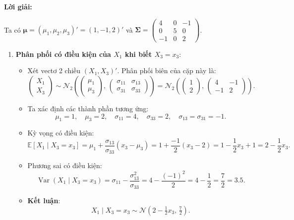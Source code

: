 \documentclass[11pt,a4paper]{article}
\newenvironment{solution}{%
  \par\noindent\textbf{Lời giải:}\ \ignorespaces
}{\par}
\theoremstyle{definition}
\newcommand{\answer}[1]{\boxed{#1}}
\begin{document}
\begin{solution}
Ta có $\boldsymbol{\mu} = (\mu_1, \mu_2, \mu_3)' = (1, -1, 2)'$ và $\boldsymbol{\Sigma} = \begin{pmatrix} 4 & 0 & -1 \\ 0 & 5 & 0 \\ -1 & 0 & 2 \end{pmatrix}$.

\begin{enumerate}[label=\textbf{\alph*)}]
  \item \textbf{Phân phối có điều kiện của $X_1$ khi biết $X_3 = x_3$}:
  \begin{itemize}
    \item Xét vectơ 2 chiều $(X_1, X_3)'$. Phân phối biên của cặp này là:
    \[
    \begin{pmatrix} X_1 \\ X_3 \end{pmatrix} \sim \mathcal{N}_2\left( \begin{pmatrix} \mu_1 \\ \mu_3 \end{pmatrix}, \, \begin{pmatrix} \sigma_{11} & \sigma_{13} \\ \sigma_{31} & \sigma_{33} \end{pmatrix} \right) = \mathcal{N}_2\left( \begin{pmatrix} 1 \\ 2 \end{pmatrix}, \, \begin{pmatrix} 4 & -1 \\ -1 & 2 \end{pmatrix} \right).
    \]
    \item Ta xác định các thành phần tương ứng:
    \[
    \mu_1 = 1, \quad \mu_3 = 2, \quad \sigma_{11} = 4, \quad \sigma_{33} = 2, \quad \sigma_{13} = \sigma_{31} = -1.
    \]
    \item Kỳ vọng có điều kiện:
    \[
    \mathbb{E}[X_1 \mid X_3 = x_3] = \mu_1 + \frac{\sigma_{13}}{\sigma_{33}}(x_3 - \mu_3) = 1 + \frac{-1}{2}(x_3 - 2) = 1 - \frac{1}{2}x_3 + 1 = 2 - \frac{1}{2}x_3.
    \]
    \item Phương sai có điều kiện:
    \[
    \operatorname{Var}(X_1 \mid X_3 = x_3) = \sigma_{11} - \frac{\sigma_{13}^2}{\sigma_{33}} = 4 - \frac{(-1)^2}{2} = 4 - \frac{1}{2} = \frac{7}{2} = 3.5.
    \]
    \item \textbf{Kết luận}:
    \[
    X_1 \mid X_3 = x_3 \sim \answer{\mathcal{N}\left( 2 - \tfrac{1}{2}x_3, \, \tfrac{7}{2} \right)}.
    \]
  \end{itemize}


\end{enumerate}
\end{solution}
\end{document}
